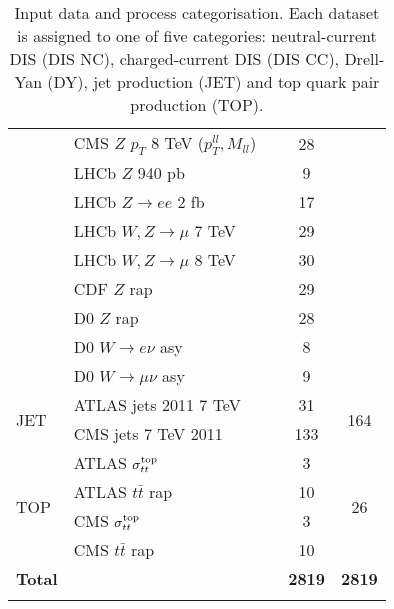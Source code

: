 \begin{table}[!t]
\begin{tabularx}{\textwidth}{llccc}
& CMS $Z$ $p_T$ 8 TeV ($p_T^{ll},M_{ll}$)      &  \cite{Khachatryan:2015oaa}    & 28  &  \\
& LHCb $Z$ 940 pb      &  \cite{Aaij:2012vn}    & 9  &  \\
& LHCb $Z \to ee$ 2 fb   & \cite{Aaij:2012mda}    & 17  &      \\
& LHCb $W, Z \to \mu$ 7 TeV  &  \cite{Aaij:2015gna}    & 29  &   \\
& LHCb $W, Z \to \mu$ 8 TeV &  \cite{Aaij:2015zlq}     & 30  &      \\
& CDF $Z$ rap    &  \cite{Aaltonen:2010zza}       & 29   &     \\
& D0 $Z$ rap    &  \cite{Abazov:2007jy}        & 28  &     \\
& D0 $W\to e\nu$ asy  & \cite{D0:2014kma}         & 8  &     \\
& D0 $W\to\mu\nu$ asy     &  \cite{Abazov:2013rja}        &  9 &   \\
\midrule
\multirow{2}{*}{JET}   & ATLAS jets 2011 7 TeV    & \cite{Aad:2011fc}  &  31 &  \multirow{2}{*}{164}    \\
& CMS jets 7 TeV 2011       & \cite{Chatrchyan:2012bja}  &  133  &  \\
\midrule
\multirow{4}{*}{TOP}     &
ATLAS $\sigma_{tt}^{\rm top}$       & \cite{Aad:2014kva, Aaboud:2016pbd}  & 3  & \multirow{4}{*}{26}  \\
& ATLAS $t\bar{t}$ rap &  \cite{Aad:2015mbv} & 10   &\\
& CMS $\sigma_{tt}^{\rm top}$   & \cite{Khachatryan:2016mqs, Khachatryan:2015uqb}       &  3 &   \\
& CMS $t\bar{t}$ rap   & \cite{Khachatryan:2015oqa}& 10   &   \\
\bottomrule
 \textbf{Total}    &         &        &  \textbf{2819}  &   \textbf{2819}  \\
\bottomrule \\
  \end{tabularx}
 \caption{\small Input data and process categorisation.
    Each dataset is assigned to one of five categories:
    neutral-current DIS (DIS NC),
    charged-current DIS (DIS CC), Drell-Yan (DY), jet production (JET) and top quark
    pair production (TOP).
    \label{tab:datasets_process_categorisation}}
\end{table}

